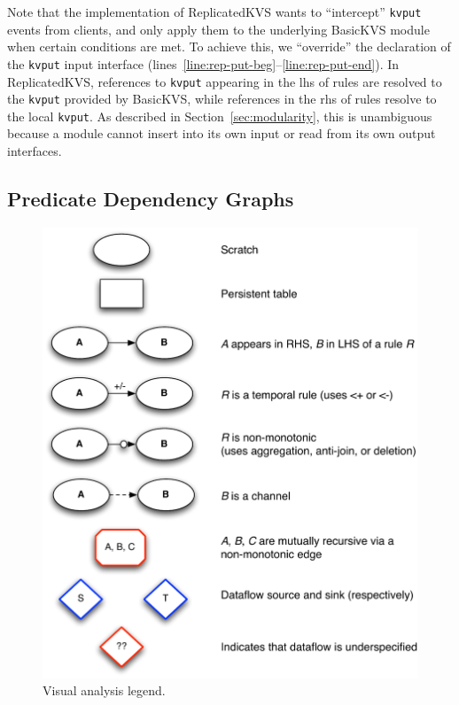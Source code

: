 Note that the implementation of ReplicatedKVS wants to ``intercept''
\texttt{kvput} events from clients, and only apply them to the underlying
BasicKVS module when certain conditions are met. To achieve this, we
``override'' the declaration of the \texttt{kvput} input interface
(lines~\ref{line:rep-put-beg}--\ref{line:rep-put-end}). In ReplicatedKVS,
references to \texttt{kvput} appearing in the lhs of rules are resolved to the
\texttt{kvput} provided by BasicKVS, while references in the rhs of rules
resolve to the local \texttt{kvput}. As described in
Section~\ref{sec:modularity}, this is unambiguous because a module cannot insert
into its own input or read from its own output interfaces.

\subsection{Predicate Dependency Graphs}
\begin{figure}[t]
\centering
\includegraphics[width=0.9\linewidth]{fig/mittalk_legend.pdf}
\vspace{-10pt}
\caption{Visual analysis legend.}
\label{fig:analysis-legend}
\vspace{-2pt}
\end{figure}

